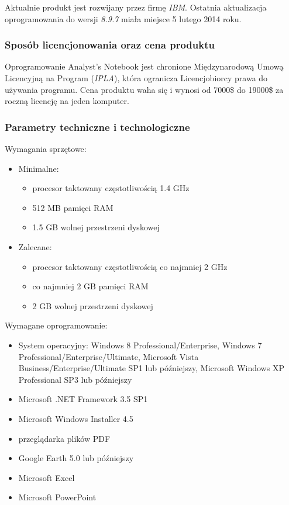 \documentclass[11pt,a4paper]{article}
\begin{document}
Aktualnie produkt jest rozwijany przez firmę \emph{IBM}. Ostatnia aktualizacja oprogramowania do wersji \emph{8.9.7} miała miejsce 5 lutego 2014 roku.

\subsubsection*{Sposób licencjonowania oraz cena produktu}

Oprogramowanie Analyst's Notebook jest chronione Międzynarodową Umową Licencyjną na Program (\emph{IPLA}), która ogranicza Licencjobiorcy prawa do używania programu. Cena produktu waha się i wynosi od 7000\$ do 19000\$ za roczną licencję na jeden komputer.

\subsubsection*{Parametry techniczne i technologiczne}

Wymagania sprzętowe:
\begin{itemize}
	\item Minimalne:
		\begin{itemize}
			\item procesor taktowany częstotliwością 1.4 GHz
    		\item 512 MB pamięci RAM
    		\item 1.5 GB wolnej przestrzeni dyskowej
		\end{itemize}
	\item Zalecane: 
		\begin{itemize}
			\item procesor taktowany częstotliwością co najmniej 2 GHz
    		\item co najmniej 2 GB pamięci RAM
    		\item 2 GB wolnej przestrzeni dyskowej
		\end{itemize}
\end{itemize}

\raggedright{Wymagane oprogramowanie:}
\begin{itemize}
	\item System operacyjny: Windows 8 Professional/Enterprise, Windows 7 Professional/Enterprise/Ultimate, Microsoft Vista Business/Enterprise/Ultimate SP1 lub późniejszy, Microsoft Windows XP Professional SP3 lub późniejszy
	\item Microsoft .NET Framework 3.5 SP1
	\item Microsoft Windows Installer 4.5
	\item przeglądarka plików PDF
	\item Google Earth 5.0 lub późniejszy
	\item Microsoft Excel
	\item Microsoft PowerPoint
\end{itemize}
\end{document}

